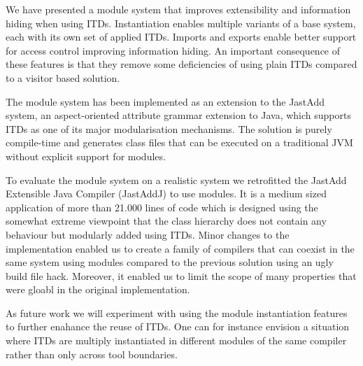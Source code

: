 We have presented a module system that improves extensibility and
information hiding when using ITDs. Instantiation enables multiple
variants of a base system, each with its own set of applied ITDs. Imports
and exports enable better support for access control improving information
hiding. An important consequence of these features is that they remove some
deficiencies of using plain ITDs compared to a visitor based solution.

The module system has been implemented as an extension to the JastAdd
system, an aspect-oriented attribute grammar extension to Java, which
supports ITDs as one of its major modularisation mechanisms. The solution
is purely compile-time and generates class files that can be executed on
a traditional JVM without explicit support for modules.

To evaluate the module system on a realistic system we retrofitted the
JastAdd Extensible Java Compiler (JastAddJ) to use modules. It is a medium
sized application of more than 21.000 lines of code which is designed using
the somewhat extreme viewpoint that the class hierarchy does not contain
any behaviour but modularly added using ITDs. Minor changes to the
implementation enabled us to create a family of compilers that can coexist
in the same system using modules compared to the previous solution using an
ugly build file hack. Moreover, it enabled us to limit the scope of many
properties that were gloabl in the original implementation.

As future work we will experiment with using the module instantiation
features to further enahance the reuse of ITDs. One can for instance
envision a situation where ITDs are multiply instantiated in different
modules of the same compiler rather than only across tool boundaries.
